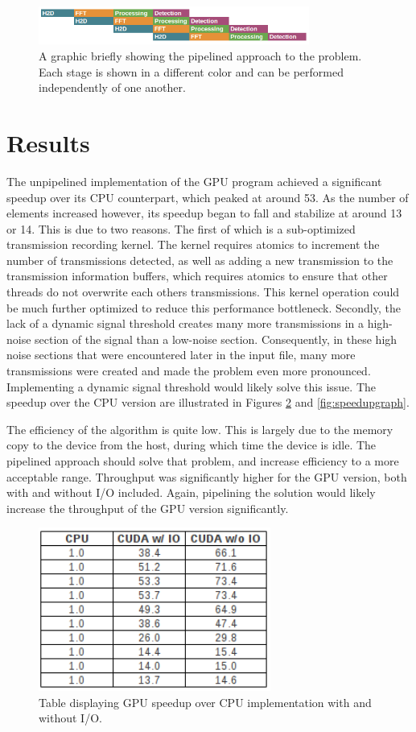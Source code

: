 \documentclass[conference]{IEEEtran}
\begin{document}
\begin{figure}[ht!]
\centering
\includegraphics[width=3.5in]{pipeline.png}
\caption{A graphic briefly showing the pipelined approach to the problem. Each stage is shown in a different color and can be performed independently of one another.}
\label{fig:pipeline}
\end{figure}

\section{Results}

The unpipelined implementation of the GPU program achieved a significant speedup
over its CPU counterpart, which peaked at around 53. As the number of elements
increased however, its speedup began to fall and stabilize at around 13 or 14. This
is due to two reasons. The first of which is a sub-optimized transmission recording
kernel. The kernel requires atomics to increment the number of transmissions detected,
as well as adding a new transmission to the transmission information buffers, which 
requires atomics to ensure that other threads do not overwrite each others 
transmissions. This kernel operation could be much further optimized to reduce this
performance bottleneck. Secondly, the lack of a dynamic signal threshold creates
many more transmissions in a high-noise section of the signal than a low-noise
section. Consequently, in these high noise sections that were encountered later
in the input file, many more transmissions were created and made the problem even
more pronounced. Implementing a dynamic signal threshold would likely solve this
issue. The speedup over the CPU version are illustrated in Figures \ref{fig:speedup}
and \ref{fig:speedupgraph}.

The efficiency of the algorithm is quite low. This is largely due to the memory
copy to the device from the host, during which time the device is idle. The pipelined
approach should solve that problem, and increase efficiency to a more acceptable
range. Throughput was significantly higher for the GPU version, both with and
without I/O included. Again, pipelining the solution would likely increase the
throughput of the GPU version significantly.

\begin{figure}[ht!]
\centering
\includegraphics[width=3in]{speedup.png}
\caption{Table displaying GPU speedup over CPU implementation with and without I/O.}
\label{fig:speedup}
\end{figure}
\end{document}
